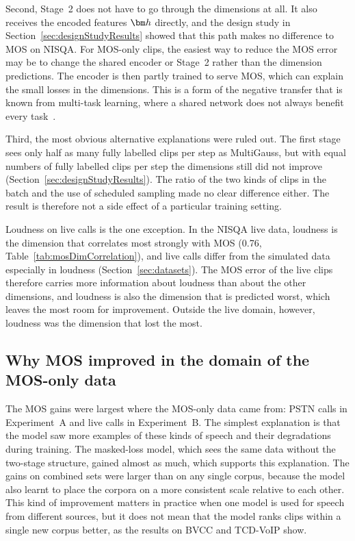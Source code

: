 \documentclass[
english,                 %
bibtex,                  %
includeExtraAbstracts, %
]{kththesis}
\numberwithin{listing}{chapter}
\begin{document}
Second, Stage~2 does not have to go through the dimensions at all. It also receives the encoded features $\vect{h}$ directly, and the design study in Section~\ref{sec:designStudyResults} showed that this path makes no difference to MOS on NISQA. For MOS-only clips, the easiest way to reduce the MOS error may be to change the shared encoder or Stage~2 rather than the dimension predictions. The encoder is then partly trained to serve MOS, which can explain the small losses in the dimensions. This is a form of the negative transfer that is known from multi-task learning, where a shared network does not always benefit every task~\cite{caruana_multitask_1997}.

Third, the most obvious alternative explanations were ruled out. The first stage sees only half as many fully labelled clips per step as MultiGauss, but with equal numbers of fully labelled clips per step the dimensions still did not improve (Section~\ref{sec:designStudyResults}). The ratio of the two kinds of clips in the batch and the use of scheduled sampling made no clear difference either. The result is therefore not a side effect of a particular training setting.

Loudness on live calls is the one exception. In the NISQA live data, loudness is the dimension that correlates most strongly with MOS (0.76, Table~\ref{tab:mosDimCorrelation}), and live calls differ from the simulated data especially in loudness (Section~\ref{sec:datasets}). The MOS error of the live clips therefore carries more information about loudness than about the other dimensions, and loudness is also the dimension that is predicted worst, which leaves the most room for improvement. Outside the live domain, however, loudness was the dimension that lost the most.

\subsection{Why MOS improved in the domain of the MOS-only data}

The MOS gains were largest where the MOS-only data came from: PSTN calls in Experiment~A and live calls in Experiment~B. The simplest explanation is that the model saw more examples of these kinds of speech and their degradations during training. The masked-loss model, which sees the same data without the two-stage structure, gained almost as much, which supports this explanation. The gains on combined sets were larger than on any single corpus, because the model also learnt to place the corpora on a more consistent scale relative to each other. This kind of improvement matters in practice when one model is used for speech from different sources, but it does not mean that the model ranks clips within a single new corpus better, as the results on BVCC and TCD-VoIP show.
\end{document}
